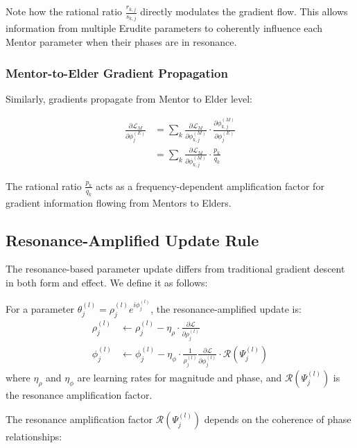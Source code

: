 Note how the rational ratio $\frac{r_{k,j}}{s_{k,j}}$ directly modulates the gradient flow. This allows information from multiple Erudite parameters to coherently influence each Mentor parameter when their phases are in resonance.

\subsubsection{Mentor-to-Elder Gradient Propagation}

Similarly, gradients propagate from Mentor to Elder level:

\begin{align}
\frac{\partial \mathcal{L}_M}{\partial \phi^{(E)}_j} &= \sum_k \frac{\partial \mathcal{L}_M}{\partial \phi^{(M)}_{k,j}} \cdot \frac{\partial \phi^{(M)}_{k,j}}{\partial \phi^{(E)}_j} \\
&= \sum_k \frac{\partial \mathcal{L}_M}{\partial \phi^{(M)}_{k,j}} \cdot \frac{p_k}{q_k}
\end{align}

The rational ratio $\frac{p_k}{q_k}$ acts as a frequency-dependent amplification factor for gradient information flowing from Mentors to Elders.

\subsection{Resonance-Amplified Update Rule}

The resonance-based parameter update differs from traditional gradient descent in both form and effect. We define it as follows:

\begin{definition}
For a parameter $\theta^{(l)}_j = \rho^{(l)}_j e^{i\phi^{(l)}_j}$, the resonance-amplified update is:
\begin{align}
\rho^{(l)}_j &\leftarrow \rho^{(l)}_j - \eta_{\rho} \cdot \frac{\partial \mathcal{L}}{\partial \rho^{(l)}_j} \\
\phi^{(l)}_j &\leftarrow \phi^{(l)}_j - \eta_{\phi} \cdot \frac{1}{\rho^{(l)}_j}\frac{\partial \mathcal{L}}{\partial \phi^{(l)}_j} \cdot \mathcal{R}(\Psi^{(l)}_j)
\end{align}
where $\eta_{\rho}$ and $\eta_{\phi}$ are learning rates for magnitude and phase, and $\mathcal{R}(\Psi^{(l)}_j)$ is the resonance amplification factor.
\end{definition}

The resonance amplification factor $\mathcal{R}(\Psi^{(l)}_j)$ depends on the coherence of phase relationships:

